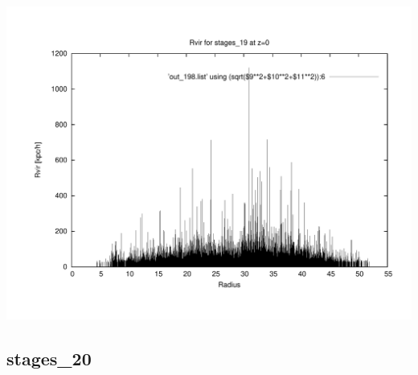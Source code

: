 \includegraphics[scale=0.3]{stages_19/plot_rvir_z0.pdf}

% 
%
%
%
%
%
%
%

\newpage
\subsection{stages\_20}

